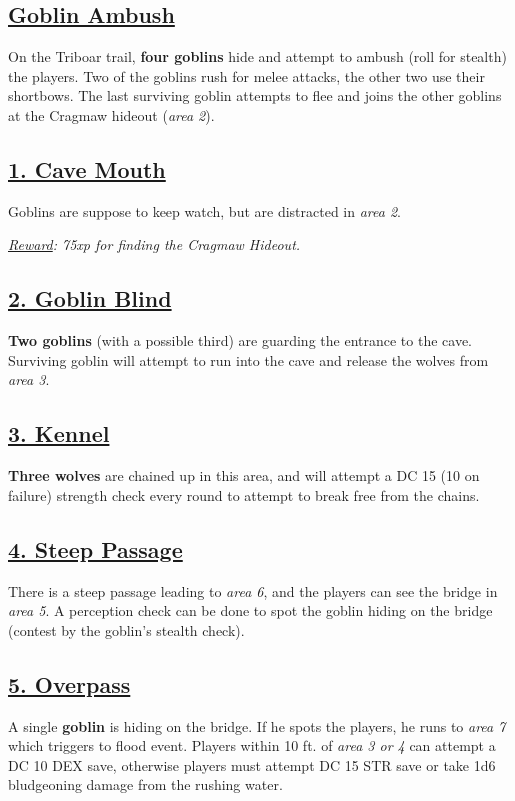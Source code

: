 \subsection*{\underline{Goblin Ambush}}
On the Triboar trail, \textbf{four goblins} hide and attempt to ambush (roll for stealth) the players. Two of the goblins rush for melee attacks, the other two use their shortbows. The last surviving goblin attempts to flee and joins the other goblins at the Cragmaw hideout (\emph{area 2}).

\subsection*{\underline{1. Cave Mouth}}
Goblins are suppose to keep watch, but are distracted in \emph{area 2}.

\emph{\underline{Reward}: 75xp for finding the Cragmaw Hideout.}

\subsection*{\underline{2. Goblin Blind}}
\textbf{Two goblins} (with a possible third) are guarding the entrance to the cave. Surviving goblin will attempt to run into the cave and release the wolves from \emph{area 3}.

\subsection*{\underline{3. Kennel}}
\textbf{Three wolves} are chained up in this area, and will attempt a DC 15 (10 on failure) strength check every round to attempt to break free from the chains.

\subsection*{\underline{4. Steep Passage}}
There is a steep passage leading to \emph{area 6}, and the players can see the bridge in \emph{area 5}. A perception check can be done to spot the goblin hiding on the bridge (contest by the goblin's stealth check).

\subsection*{\underline{5. Overpass}}
A single \textbf{goblin} is hiding on the bridge. If he spots the players, he runs to \emph{area 7} which triggers to flood event. Players within 10 ft. of \emph{area 3 or 4} can attempt a DC 10 DEX save, otherwise players must attempt DC 15 STR save or take 1d6 bludgeoning damage from the rushing water.

